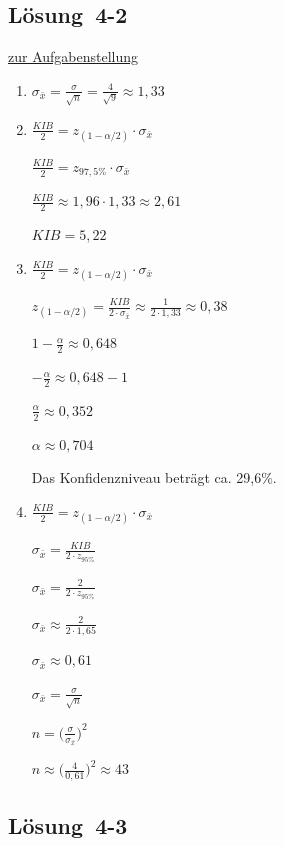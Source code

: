 \documentclass[
  11pt,
  ngerman,
  a4paper,
]{report}
\begin{document}
\hypertarget{loesung-4-2}{%
\subsection{Lösung~4-2}\label{loesung-4-2}}

\protect\hyperlink{aufgabe-4-2}{zur Aufgabenstellung}

\begin{enumerate}
\def\labelenumi{\alph{enumi})}
\item
  \(\sigma _{\bar{x}}=\frac{\sigma}{\sqrt{n}}=\frac{4}{\sqrt{9}}\approx1{,}33\)
\item
  \(\frac{\mathit{KIB}}{2}=z_{(1-\alpha/2)} \cdot \sigma_{\bar{x}}\)

  \(\frac{\mathit{KIB}}{2}= z_{97{,}5\%}\cdot \sigma_{\bar{x}}\)

  \(\frac{\mathit{KIB}}{2}\approx 1{,}96 \cdot 1{,}33 \approx 2{,}61\)

  \(\mathit{KIB}=5{,}22\)
\item
  \(\frac{\mathit{KIB}}{2}=z_{(1-\alpha/2)} \cdot \sigma_{\bar{x}}\)

  \(z_{(1-\alpha/2)} = \frac{\mathit{KIB}}{2 \cdot \sigma_{\bar{x}}}\approx\frac{1}{2 \cdot 1{,}33}\approx0{,}38\)

  \(1-\frac{\alpha}{2} \approx 0{,}648\)

  \(-\frac{\alpha}{2} \approx 0{,}648 - 1\)

  \(\frac{\alpha}{2} \approx 0{,}352\)

  \(\alpha \approx 0{,}704\)

  Das Konfidenzniveau beträgt ca. 29,6\%.
\item
  \(\frac{\mathit{KIB}}{2} = z_{(1-\alpha/2)} \cdot \sigma_{\bar{x}}\)

  \(\sigma_{\bar{x}} = \frac{\mathit{KIB}}{2\cdot z_{95\%}}\)

  \(\sigma_{\bar{x}} = \frac{2}{2 \cdot z_{95\%}}\)

  \(\sigma_{\bar{x}} \approx \frac{2}{2 \cdot 1{,}65}\)

  \(\sigma_{\bar{x}} \approx 0{,}61\)

  \(\sigma_{\bar{x}}=\frac{\sigma}{\sqrt{n}}\)

  \(n = \big(\frac{\sigma}{\sigma_{\bar{x}}}\big)^2\)

  \(n \approx \big(\frac{4}{0{,}61}\big)^2\approx43\)
\end{enumerate}

\hypertarget{loesung-4-3}{%
\subsection{Lösung~4-3}\label{loesung-4-3}}
\end{document}
